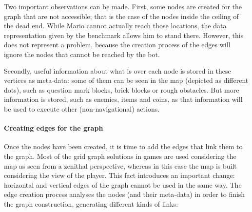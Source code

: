 \documentclass[conference]{IEEEtran}
\begin{document}
Two important observations can be made. First, 
some nodes are created for the graph that are not accessible;
that is the case of the nodes inside the ceiling of the dead end. While 
Mario cannot actually reach those locations, the data representation given by the
benchmark allows him to stand there. However, this does not represent a problem, 
because the creation process of the edges will ignore the nodes that cannot be reached
by the bot.

Secondly, useful information about what is over each node is stored in these vertices 
as meta-data: some of them can be seen in the map (depicted as different dots), 
such as question mark blocks, brick blocks or rough obstacles. But more information 
is stored, such as enemies, items and coins, as that information will 
be used to execute other (non-navigational) actions. 

\paragraph{Creating edges for the graph}

Once the nodes have been created, it is time to add the edges that link them to the graph.
Most of the grid graph solutions in games are used considering the map as seen from 
a zenithal perspective, whereas in this case the map is built considering the view of the 
player. This fact introduces an important change: horizontal
and vertical edges of the graph cannot be used in the same way.
The edge creation process analyses the nodes (and their meta-data) in order to finish
the graph construction, generating different kinds of links:
\end{document}
